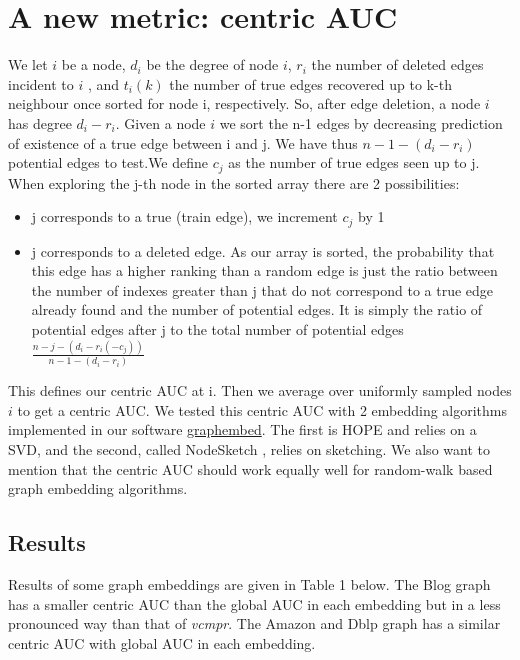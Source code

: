 \documentclass{article}
\begin{document}
\section{A new metric: centric AUC}

We let $i$ be a node, $d_{i}$ be the degree of node $i$, $r_{i}$ the number of deleted edges incident to $i$ , and $t_{i}(k)$ the number of true edges
recovered up to k-th neighbour once sorted for node i, respectively. So, after edge deletion, a node $i$ has degree $d_{i} - r_{i}$.
Given a node $i$ we sort the n-1 edges by decreasing prediction of existence of a true edge between i and j.
We have thus $ n - 1 - (d_{i} - r_{i})$  potential edges to test.We define $c_{j}$  as the number of true edges seen up to j.
When exploring the j-th node in the sorted array there are 2 possibilities:
\begin{itemize}
    \item j corresponds to a true (train edge), we increment $c_{j}$ by 1
    \item j corresponds to a deleted edge. As our array is sorted, the probability that this edge has a higher
          ranking than a random edge is just the ratio between the number of indexes greater than j that do not correspond
          to a true edge already found and the number of potential edges. It is simply the ratio of potential edges after j to
          the total number of potential edges $ \frac{n-j-(d_{i}-r_{i}(-c_{j}))}{n-1-(d_{i}-r_{i})}$
\end{itemize}
This defines our centric AUC at i.  Then we average over uniformly sampled nodes $i$ to get a centric AUC.
We tested this centric AUC with 2 embedding algorithms implemented in our software \href{https://github.com/jean-pierreBoth/graphembed}{\color{blue}graphembed}.
The first is HOPE \citep{Cui} and relies on a SVD, and the second, called NodeSketch \citep{Yang}, relies on sketching. We also want to mention that the centric AUC should work equally well for random-walk based graph embedding algorithms. 

\subsection{Results}

Results of some graph embeddings are given in Table 1 below. The Blog graph has a smaller centric AUC than the global AUC in each embedding but in a less pronounced way than that of \textit{vcmpr}. The Amazon and Dblp graph has a similar centric AUC with global AUC in each embedding.
\end{document}
